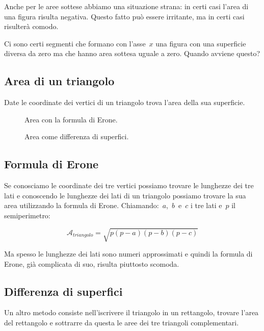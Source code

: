 Anche per le aree sottese abbiamo una situazione strana: in certi casi 
l'area di una figura risulta negativa. Questo fatto può essere irritante, 
ma in certi casi risulterà comodo.

Ci sono certi segmenti che formano con l'asse~$x$ una figura con una 
superficie diversa da zero ma che hanno area sottesa uguale a zero.
Quando avviene questo?

\subsection{Area di un triangolo}

Date le coordinate dei vertici di un triangolo trova l'area della sua 
superficie.

\begin{inaccessibleblock}
 \begin{figure}[h]
 \centering
 \begin{minipage}[t]{.45\textwidth}
  \centering \triangoloerone
  \caption{Area con la formula di Erone.}\label{fig:triangoloerone}
 \end{minipage}\hfil
 \begin{minipage}[t]{.45\textwidth}
  \centering \triangolodifferenza
  \caption{Area come differenza di superfici.}\label{fig:triangolodifferenza}
 \end{minipage}\hfil
\end{figure}
\end{inaccessibleblock}

\subsection*{Formula di Erone}
Se conosciamo le coordinate dei tre vertici possiamo trovare le lunghezze dei 
tre lati e conoscendo le lunghezze dei lati di un triangolo possiamo trovare
la sua area utilizzando la formula di Erone. Chiamando:~$a$,~$b$~e~$c$ i tre 
lati e~$p$ il semiperimetro:

\[\mathcal{A}_{triangolo} = \sqrt{p(p-a)(p-b)(p-c)}\]

Ma spesso le lunghezze dei lati sono numeri approssimati e quindi la formula
di Erone, già complicata di suo, risulta piuttosto scomoda.

\subsection*{Differenza di superfici}
Un altro metodo consiste nell'iscrivere il triangolo in un rettangolo, 
trovare l'area del rettangolo e sottrarre da questa le aree dei tre triangoli 
complementari.


